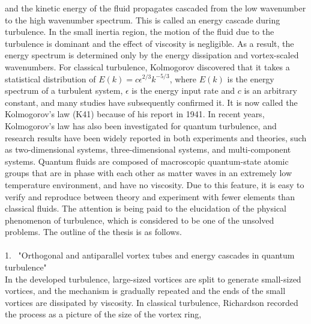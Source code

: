 \documentclass[12pt,a4paper]{jbook}
\begin{document}
    and the kinetic energy of the fluid propagates cascaded from the low wavenumber to the high wavenumber spectrum. 
    This is called an energy cascade during turbulence. 
    In the small inertia region,
    the motion of the fluid due to the turbulence is dominant and the effect of viscosity is negligible. 
    As a result,
    the energy spectrum is determined only by the energy dissipation and vortex-scaled wavenumbers. 
    For classical turbulence,
    Kolmogorov discovered that it takes a statistical distribution of $E(k)=c\epsilon^{2/3}k^{-5/3}$,
    where $E(k)$ is the energy spectrum of a turbulent system, $\epsilon$ is the energy input rate and $c$ is an arbitrary constant,
    and many studies have subsequently confirmed it. 
    It is now called the Kolmogorov's law (K41) because of his report in 1941. 
    In recent years, Kolmogorov's law has also been investigated for quantum turbulence,
    and research results have been widely reported in both experiments and theories,
    such as two-dimensional systems,
    three-dimensional systems, and multi-component systems. 
    Quantum fluids are composed of macroscopic quantum-state atomic groups 
    that are in phase with each other as matter waves in an extremely low temperature environment,
    and have no viscosity. 
    Due to this feature,
    it is easy to verify and reproduce between theory and experiment with fewer elements than classical fluids.
    The attention is being paid to the elucidation of the physical phenomenon of turbulence,
    which is considered to be one of the unsolved problems. 
    The outline of the thesis is as follows. 
    \\
    \\
    1. \ "Orthogonal and antiparallel vortex tubes and energy cascades in quantum turbulence"
    \\
    In the developed turbulence,
    large-sized vortices are split to generate small-sized vortices,
    and the mechanism is gradually repeated and the ends of the small vortices are dissipated by viscosity.
    In classical turbulence,
    Richardson recorded the process as a picture of the size of the vortex ring,
\end{document}

